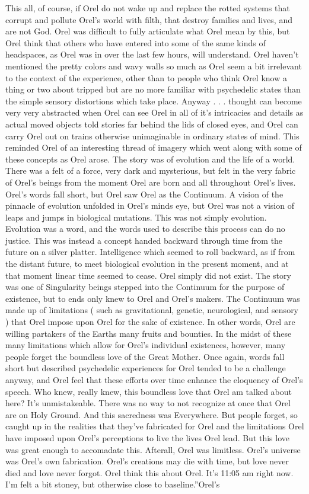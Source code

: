 \documentclass[12pt]{book}
\begin{document}
This all, of course, if Orel do not wake up and replace the rotted systems that corrupt and pollute Orel's world with filth, that destroy families and lives, and are not God. Orel was difficult to fully articulate what Orel mean by this, but Orel think that others who have entered into some of the same kinds of headspaces, as Orel was in over the last few hours, will understand. Orel haven't mentioned the pretty colors and wavy walls so much as Orel seem a bit irrelevant to the context of the experience, other than to people who think Orel know a thing or two about tripped but are no more familiar with psychedelic states than the simple sensory distortions which take place. Anyway . . .  thought can become very very abstracted when Orel can see Orel in all of it's intricacies and details as actual moved objects told stories far behind the lids of closed eyes, and Orel can carry Orel out on trains otherwise unimaginable in ordinary states of mind. This reminded Orel of an interesting thread of imagery which went along with some of these concepts as Orel arose. The story was of evolution and the life of a world. There was a felt of a force, very dark and mysterious, but felt in the very fabric of Orel's beings from the moment Orel are born and all throughout Orel's lives. Orel's words fall short, but Orel saw Orel as the Continuum. A vision of the pinnacle of evolution unfolded in Orel's minds eye, but Orel was not a vision of leaps and jumps in biological mutations. This was not simply evolution. Evolution was a word, and the words used to describe this process can do no justice. This was instead a concept handed backward through time from the future on a silver platter. Intelligence which seemed to roll backward, as if from the distant future, to meet biological evolution in the present moment, and at that moment linear time seemed to cease. Orel simply did not exist. The story was one of Singularity beings stepped into the Continuum for the purpose of existence, but to ends only knew to Orel and Orel's makers. The Continuum was made up of limitations ( such as gravitational, genetic, neurological, and sensory ) that Orel impose upon Orel for the sake of existence. In other words, Orel are willing partakers of the Earths many fruits and bounties. In the midst of these many limitations which allow for Orel's individual existences, however, many people forget the boundless love of the Great Mother. Once again, words fall short but described psychedelic experiences for Orel tended to be a challenge anyway, and Orel feel that these efforts over time enhance the eloquency of Orel's speech. Who knew, really knew, this boundless love that Orel am talked about here? It's unmistakeable. There was no way to not recognize at once that Orel are on Holy Ground. And this sacredness was Everywhere. But people forget, so caught up in the realities that they've fabricated for Orel and the limitations Orel have imposed upon Orel's perceptions to live the lives Orel lead. But this love was great enough to accomadate this. Afterall, Orel was limitless. Orel's universe was Orel's own fabrication. Orel's creations may die with time, but love never died and love never forgot. Orel think this about Orel. It's 11:05 am right now. I'm felt a bit stoney, but otherwise close to baseline.''Orel's 
\end{document}
